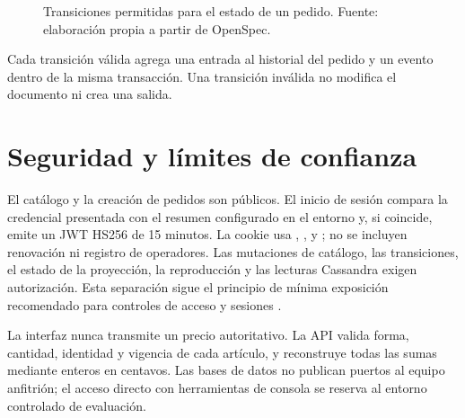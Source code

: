 \begin{figure}[H]
  \centering
  \caption{Transiciones permitidas para el estado de un pedido. Fuente: elaboración propia a partir de OpenSpec.}
  \label{fig:estados}
\end{figure}

Cada transición válida agrega una entrada al historial del pedido y un evento  dentro de la misma transacción. Una transición inválida no modifica el documento ni crea una salida.

\section{Seguridad y límites de confianza}

El catálogo y la creación de pedidos son públicos. El inicio de sesión compara la credencial presentada con el resumen configurado en el entorno y, si coincide, emite un JWT HS256 de 15 minutos. La cookie usa , ,  y ; no se incluyen renovación ni registro de operadores. Las mutaciones de catálogo, las transiciones, el estado de la proyección, la reproducción y las lecturas Cassandra exigen autorización. Esta separación sigue el principio de mínima exposición recomendado para controles de acceso y sesiones \parencite{owaspASVS}.

La interfaz nunca transmite un precio autoritativo. La API valida forma, cantidad, identidad y vigencia de cada artículo, y reconstruye todas las sumas mediante enteros en centavos. Las bases de datos no publican puertos al equipo anfitrión; el acceso directo con herramientas de consola se reserva al entorno controlado de evaluación.


